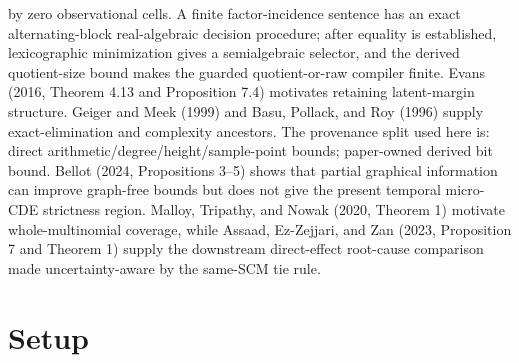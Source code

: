 \documentclass{article}
\begin{document}
by zero observational cells. A finite factor-incidence sentence has an exact alternating-block real-algebraic decision procedure; after equality is established, lexicographic minimization gives a semialgebraic selector, and the derived quotient-size bound makes the guarded quotient-or-raw compiler finite. Evans (2016, Theorem 4.13 and Proposition 7.4) motivates retaining latent-margin structure. Geiger and Meek (1999) and Basu, Pollack, and Roy (1996) supply exact-elimination and complexity ancestors. The provenance split used here is: direct arithmetic/degree/height/sample-point bounds; paper-owned derived bit bound. Bellot (2024, Propositions 3--5) shows that partial graphical information can improve graph-free bounds but does not give the present temporal micro-CDE strictness region. Malloy, Tripathy, and Nowak (2020, Theorem 1) motivate whole-multinomial coverage, while Assaad, Ez-Zejjari, and Zan (2023, Proposition 7 and Theorem 1) supply the downstream direct-effect root-cause comparison made uncertainty-aware by the same-SCM tie rule.

\section{Setup}
\end{document}
